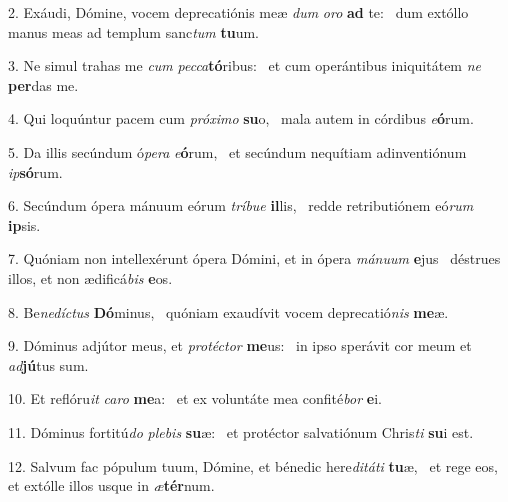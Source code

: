 2. Exáudi, Dómine, vocem deprecatiónis meæ \textit{dum} \textit{o}\textit{ro} \textbf{ad} te: \ast\  dum extóllo manus meas ad templum sanc\textit{tum} \textbf{tu}um.\

3. Ne simul trahas me \textit{cum} \textit{pec}\textit{ca}\textbf{tó}ribus: \ast\  et cum operántibus iniquitátem \textit{ne} \textbf{per}das me.\

4. Qui loquúntur pacem cum \textit{pró}\textit{xi}\textit{mo} \textbf{su}o, \ast\  mala autem in córdibus \textit{e}\textbf{ó}rum.\

5. Da illis secúndum ó\textit{pe}\textit{ra} \textit{e}\textbf{ó}rum, \ast\  et secúndum nequítiam adinventiónum \textit{ip}\textbf{só}rum.\

6. Secúndum ópera mánuum eórum \textit{trí}\textit{bu}\textit{e} \textbf{il}lis, \ast\  redde retributiónem eó\textit{rum} \textbf{ip}sis.\

7. Quóniam non intellexérunt ópera Dómini, et in ópera \textit{má}\textit{nu}\textit{um} \textbf{e}jus \ast\  déstrues illos, et non ædificá\textit{bis} \textbf{e}os.\

8. Be\textit{ne}\textit{díc}\textit{tus} \textbf{Dó}minus, \ast\  quóniam exaudívit vocem deprecatió\textit{nis} \textbf{me}æ.\

9. Dóminus adjútor meus, et \textit{pro}\textit{téc}\textit{tor} \textbf{me}us: \ast\  in ipso sperávit cor meum et \textit{ad}\textbf{jú}tus sum.\

10. Et reflóru\textit{it} \textit{ca}\textit{ro} \textbf{me}a: \ast\  et ex voluntáte mea confité\textit{bor} \textbf{e}i.\

11. Dóminus fortitú\textit{do} \textit{ple}\textit{bis} \textbf{su}æ: \ast\  et protéctor salvatiónum Chris\textit{ti} \textbf{su}i est.\

12. Salvum fac pópulum tuum, Dómine, et bénedic here\textit{di}\textit{tá}\textit{ti} \textbf{tu}æ, \ast\  et rege eos, et extólle illos usque in \textit{æ}\textbf{tér}num.\

